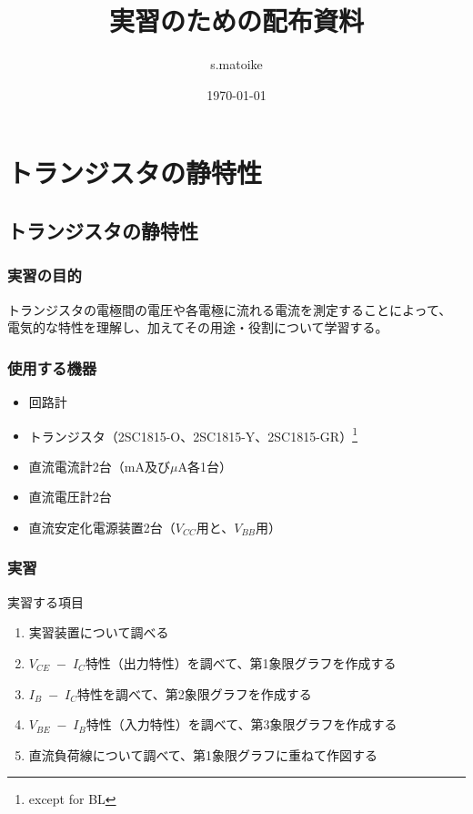 \documentclass[uplatex,a4paper,11pt,oneside,openany]{jsbook}
\begin{document}
\title{実習のための配布資料}
\author{s.matoike}
\date{\today}
\maketitle

\part{トランジスタの静特性}

\chapter{トランジスタの静特性}

\section{実習の目的}

トランジスタの電極間の電圧や各電極に流れる電流を測定することによって、
電気的な特性を理解し、加えてその用途・役割について学習する。

\section{使用する機器}

\begin{itemize}
\item 回路計
\item トランジスタ（2SC1815-O、2SC1815-Y、2SC1815-GR）\footnote{except for BL}
\item 直流電流計2台（mA及び$\mu$A各1台）
\item 直流電圧計2台
\item 直流安定化電源装置2台（$V_{CC}$用と、$V_{BB}$用）
\end{itemize}

\section{実習}

実習する項目
\begin{enumerate}
\item[(1)] 実習装置について調べる
\item[(2)] $V_{CE}\;-\;I_C$特性（出力特性）を調べて、第1象限グラフを作成する
\item[(3)] $I_B\;-\;I_C$特性を調べて、第2象限グラフを作成する
\item[(4)] $V_{BE}\;-\;I_B$特性（入力特性）を調べて、第3象限グラフを作成する
\item[(5)] 直流負荷線について調べて、第1象限グラフに重ねて作図する
\end{enumerate}
\end{document}
